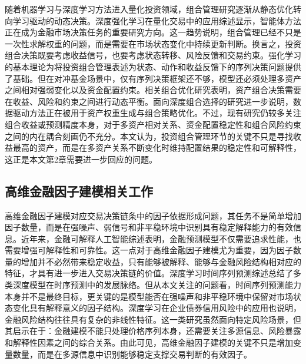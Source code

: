 随着机器学习与深度学习方法进入量化投资领域，组合管理研究逐渐从静态优化转向学习驱动的动态决策。深度强化学习在量化交易中的应用综述显示，智能体方法正在成为金融市场决策任务的重要研究方向\cite{xu2024review}。这一趋势说明，组合管理已经不只是一次性求解权重的问题，而是需要在市场状态变化中持续更新判断。换言之，投资组合决策既要考虑收益信号，也要考虑状态转移、风险反馈和交易约束。强化学习的基本理论为将投资组合管理表述为状态、动作和收益反馈下的序列决策问题提供了基础\cite{sutton2018reinforcement}。但在对冲基金场景中，仅有序列决策框架还不够，模型还必须处理多资产之间相对强弱变化以及资金配置约束。相关组合优化研究表明，资产组合决策需要在收益、风险和约束之间进行动态平衡\cite{li2021portfolio}。面向深度组合选择的研究进一步说明，数据驱动方法正在被用于资产权重生成与组合策略优化\cite{jiang2024deep}。不过，现有研究仍较多关注组合收益或预测精度本身，对于多资产相对关系、资金配置稳定性和组合风险约束之间的内在耦合刻画仍不充分。本文认为，投资组合管理环节的关键不只是寻找收益最高的资产，而是在多资产关系不断变化时维持配置结果的稳定性和可解释性，这正是本文第2章需要进一步回应的问题。

\subsection{高维金融因子建模相关工作}
高维金融因子建模对应交易决策链条中的因子依据形成问题，其任务不是简单增加因子数量，而是在强噪声、弱信号和非平稳环境中识别具有稳定解释能力的有效信息。近年来，金融可解释人工智能综述表明，金融预测模型不仅需要追求性能，也需要增强可解释性和可靠性\cite{yeo2025comprehensive}。这一点对于高维金融因子建模尤为重要，因为因子数量的增加并不必然带来稳定收益，只有能够被解释、能够与金融风险结构相对应的特征，才具有进一步进入交易决策链的价值。深度学习时间序列预测综述总结了多类深度模型在时序预测中的发展脉络\cite{li2024review}。但从本文关注的问题看，时间序列预测能力本身并不是最终目标，更关键的是模型能否在强噪声和非平稳环境中保留对市场状态变化具有解释意义的因子结构。深度学习在企业债券信用风险中的应用也说明，金融风险结构往往具有复杂的非线性特征\cite{jiang2024bond}。这一类研究虽然面向特定风险场景，但其启示在于：金融建模不能只处理价格序列本身，还需要关注多源信息、风险暴露和解释性因素之间的综合关系。由此可见，高维金融因子建模的关键不只是增加变量数量，而是在多源信息中识别能够稳定支撑交易判断的有效因子。

